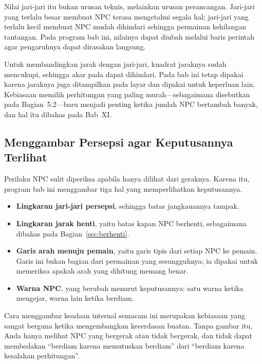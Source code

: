 Nilai jari-jari itu bukan urusan teknis, melainkan urusan perancangan. Jari-jari
yang terlalu besar membuat NPC terasa mengetahui segala hal; jari-jari yang
terlalu kecil membuat NPC mudah dihindari sehingga permainan kehilangan
tantangan. Pada program bab ini, nilainya dapat diubah melalui baris perintah
agar pengaruhnya dapat dirasakan langsung.

\begin{tipsbox}
Untuk membandingkan jarak dengan jari-jari, kuadrat jaraknya
sudah mencukupi, sehingga akar pada  dapat dihindari. Pada bab
ini  tetap dipakai karena jaraknya juga ditampilkan pada layar
dan dipakai untuk keperluan lain. Kebiasaan memilih perhitungan yang paling
murah---sebagaimana disebutkan pada Bagian~5.2---baru menjadi penting ketika
jumlah NPC bertambah banyak, dan hal itu dibahas pada Bab~XI.
\end{tipsbox}

\subsection{Menggambar Persepsi agar Keputusannya Terlihat}

Perilaku NPC sulit diperiksa apabila hanya dilihat dari geraknya. Karena itu,
program bab ini menggambar tiga hal yang memperlihatkan keputusannya.

\begin{itemize}
  \item \textbf{Lingkaran jari-jari persepsi}, sehingga batas jangkauannya
        tampak.
  \item \textbf{Lingkaran jarak henti}, yaitu batas kapan NPC berhenti,
        sebagaimana dibahas pada Bagian~\ref{sec:berhenti}.
  \item \textbf{Garis arah menuju pemain}, yaitu garis tipis dari setiap NPC ke
        pemain. Garis ini bukan bagian dari permainan yang sesungguhnya; ia
        dipakai untuk memeriksa apakah arah yang dihitung memang benar.
  \item \textbf{Warna NPC}, yang berubah menurut keputusannya: satu warna
        ketika mengejar, warna lain ketika berdiam.
\end{itemize}

Cara menggambar keadaan internal semacam ini merupakan kebiasaan yang sangat
berguna ketika mengembangkan kecerdasan buatan. Tanpa gambar itu, Anda hanya
melihat NPC yang bergerak atau tidak bergerak, dan tidak dapat membedakan
``berdiam karena memutuskan berdiam'' dari ``berdiam karena kesalahan
perhitungan''.
